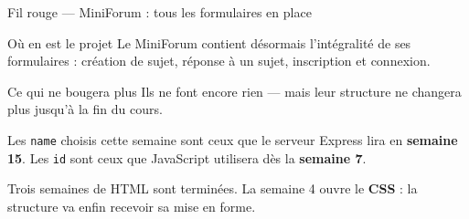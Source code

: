 \documentclass[aspectratio=169,11pt]{beamer}
\begin{document}
\begin{frame}{Fil rouge --- MiniForum : tous les formulaires en place}
  \begin{block}{Où en est le projet}
    Le MiniForum contient désormais l'intégralité de ses formulaires : création de sujet, réponse à un sujet, inscription et connexion.
  \end{block}
  \vspace{0.25cm}
  \begin{exampleblock}{Ce qui ne bougera plus}
    Ils ne font encore rien --- mais leur structure ne changera plus jusqu'à la fin du cours.
    \vspace{0.15cm}

    Les \texttt{name} choisis cette semaine sont ceux que le serveur Express lira en \textbf{semaine 15}. Les \texttt{id} sont ceux que JavaScript utilisera dès la \textbf{semaine 7}.
  \end{exampleblock}
  \vspace{0.2cm}
  \begin{center}
    \small Trois semaines de HTML sont terminées. La semaine 4 ouvre le \textbf{CSS} : la structure va enfin recevoir sa mise en forme.
  \end{center}
\end{frame}

{
\begin{frame}[plain]
\end{frame}
}
\end{document}
